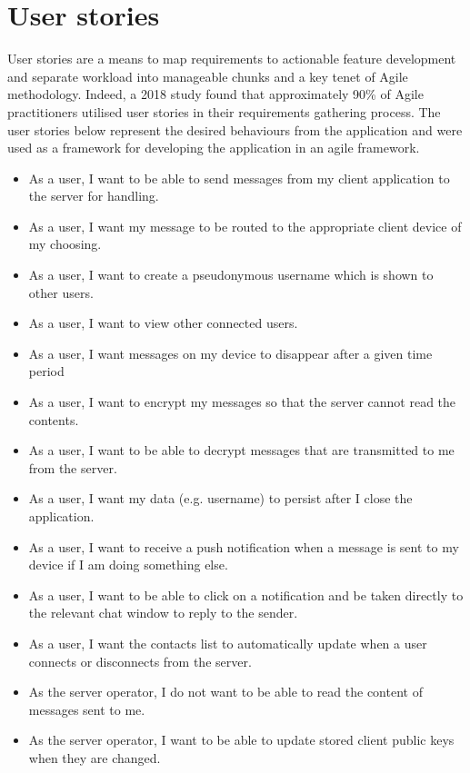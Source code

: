 \documentclass{mproj}
\begin{document}
\section{User stories}
User stories are a means to map requirements to actionable feature development and separate workload into manageable chunks and a key tenet of Agile methodology. Indeed, a 2018 study found that approximately 90\% of Agile practitioners utilised user stories in their requirements gathering process\cite{dalpiaz2018agile}.
The user stories below represent the desired behaviours from the application and were used as a framework for developing the application in an agile framework.
\begin{itemize}
	\item As a user, I want to be able to send messages from my client application to the server for handling.
	\item As a user, I want my message to be routed to the appropriate client device of my choosing.
	\item As a user, I want to create a pseudonymous username which is shown to other users.
	\item As a user, I want to view other connected users.
	\item As a user, I want messages on my device to disappear after a given time period
	\item As a user, I want to encrypt my messages so that the server cannot read the contents.
	\item As a user, I want to be able to decrypt messages that are transmitted to me from the server.
	\item As a user, I want my data (e.g. username) to persist after I close the application.
	\item As a user, I want to receive a push notification when a message is sent to my device if I am doing something else.
	\item As a user, I want to be able to click on a notification and be taken directly to the relevant chat window to reply to the sender.
	\item As a user, I want the contacts list to automatically update when a user connects or disconnects from the server.
	\item As the server operator, I do not want to be able to read the content of messages sent to me.
	\item As the server operator, I want to be able to update stored client public keys when they are changed.
\end{itemize}
\end{document}
